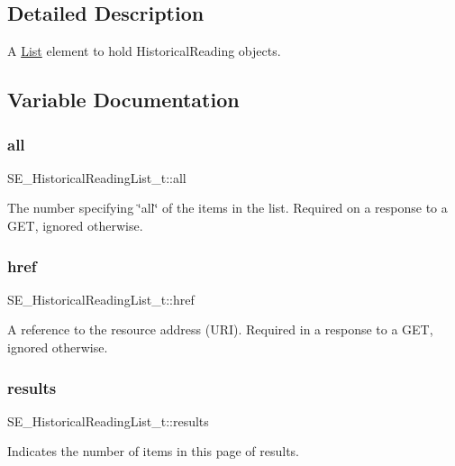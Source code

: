 \subsection{Detailed Description}
A \hyperlink{structList}{List} element to hold Historical\+Reading objects. 

\subsection{Variable Documentation}
\mbox{\label{group__HistoricalReadingList_gac457b74ad4a78aafd138081d24cf5907}} 
\subsubsection{\texorpdfstring{all}{all}}
{\footnotesize\ttfamily S\+E\+\_\+\+Historical\+Reading\+List\+\_\+t\+::all}

The number specifying \char`\"{}all\char`\"{} of the items in the list. Required on a response to a G\+ET, ignored otherwise. \mbox{\label{group__HistoricalReadingList_gadb13f23b1edd9e43645c4be5ca2a99d8}} 
\subsubsection{\texorpdfstring{href}{href}}
{\footnotesize\ttfamily S\+E\+\_\+\+Historical\+Reading\+List\+\_\+t\+::href}

A reference to the resource address (U\+RI). Required in a response to a G\+ET, ignored otherwise. \mbox{\label{group__HistoricalReadingList_gae4f835b29c288b7d9ea0db353e3a7528}} 
\subsubsection{\texorpdfstring{results}{results}}
{\footnotesize\ttfamily S\+E\+\_\+\+Historical\+Reading\+List\+\_\+t\+::results}

Indicates the number of items in this page of results. 